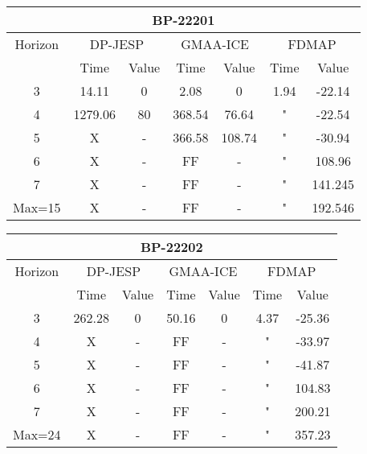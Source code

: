 \documentclass[letterpaper]{article} %
\begin{document}
\begin{center}
    \begin{tabular}{||c|c|c|c|c|c|c||}
         \hline
         \multicolumn{7}{||c||}{BP-22201} \\
         \hline
         Horizon & \multicolumn{2}{|c|}{DP-JESP} & \multicolumn{2}{|c|}{GMAA-ICE} & \multicolumn{2}{|c||}{FDMAP}\\ 
         \hline
         & Time & Value & Time & Value & Time & Value \\
         \hline
         3 & 14.11 & 0 & 2.08 & 0 & 1.94 & -22.14 \\
         \hline
         4 & 1279.06 & 80 & 368.54 & 76.64 & " & -22.54 \\
         \hline
         5 & X & - & 366.58 & 108.74 & " & -30.94 \\ 
         \hline
         6 & X & - & FF & - & " & 108.96 \\
         \hline
         7 & X & - & FF & - & " & 141.245 \\
         \hline
         Max=15 & X & - & FF & - & " & 192.546 \\
         \hline
    \end{tabular}
\end{center}

\begin{center}
    \begin{tabular}{||c|c|c|c|c|c|c||}
         \hline
         \multicolumn{7}{||c||}{BP-22202} \\
         \hline
         Horizon & \multicolumn{2}{|c|}{DP-JESP} & \multicolumn{2}{|c|}{GMAA-ICE} & \multicolumn{2}{|c||}{FDMAP}\\ 
         \hline
         & Time & Value & Time & Value & Time & Value \\
         \hline
         3 & 262.28 & 0 & 50.16 & 0 & 4.37 & -25.36 \\
         \hline
         4 & X & - & FF & - & " & -33.97 \\
         \hline
         5 & X & - & FF & - & " & -41.87 \\ 
         \hline
         6 & X & - & FF & - & " & 104.83 \\
         \hline
         7 & X & - & FF & - & " & 200.21 \\
         \hline
         Max=24 & X & - & FF & - & " & 357.23 \\
         \hline
    \end{tabular}
\end{center}
\end{document}
